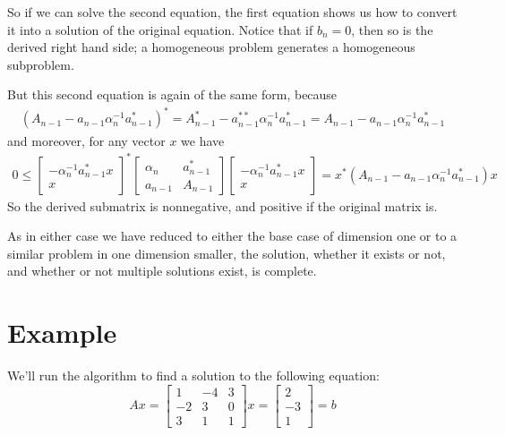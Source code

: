 \documentclass[12pt]{article}
\newcommand{\bmat}[1]{\begin{bmatrix}#1\end{bmatrix}}
\begin{document}
  
So if we can solve the second equation, the first equation shows us how to convert it into a solution
of the original equation. Notice that if 
$b_n =0 $, then so is the derived right hand side; a homogeneous problem generates
a homogeneous subproblem.

But this second equation is again of the same form, because
\begin{gather}{}(A_{n-1} - a_{n-1}\alpha_n^{-1}a_{n-1}^*)^* = 
A_{n-1}^{*} - a_{n-1}^{**}\alpha_n^{-1}a_{n-1}^* = 
A_{n-1} - a_{n-1}\alpha_n^{-1}a_{n-1}^* 
\end{gather}
and moreover, for any vector $x$ we have
\begin{gather}{}
0 \leq \bmat{-\alpha_n^{-1}a_{n-1}^*x\\x}^*\bmat{\alpha_n & a_{n-1}^* \\ a_{n-1} & A_{n-1}}\bmat{-\alpha_n^{-1}a_{n-1}^*x\\x}
= 
x^*(A_{n-1} - a_{n-1}\alpha_n^{-1}a_{n-1}^*)x
\end{gather} So the derived submatrix is nonnegative, and positive if the original matrix is.

As in either case we have reduced to either the base case of dimension one or to a similar problem in one dimension smaller, the solution, whether it exists or
not, and whether or not multiple solutions exist, is complete.
\newpage  
\section{Example}

We'll run the algorithm to find a solution to the following equation:
$$ Ax = \bmat{1 & -4 & 3\\-2 & 3 & 0\\3 & 1 & 1}x = \bmat{ 2\\ -3 \\ 1 } = b $$
\end{document}
